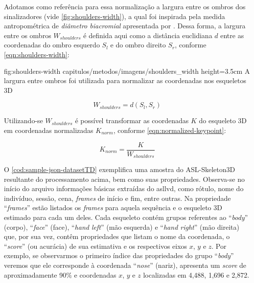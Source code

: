 \begin{enumerate}
          Adotamos como referência para essa normalização a largura entre os ombros dos sinalizadores (vide \autoref{fig:shoulders-width}), a qual foi inspirada pela medida antropométrica de \textit{diâmetro biacromial} apresentada por . Dessa forma, a largura entre os ombros \(W_{shoulders}\) é definida aqui como a distância euclidiana \(d\) entre as coordenadas do ombro esquerdo \(S_{l}\) e do ombro direito \(S_ {r}\), conforme \autoref{eqn:shoulders-width}:

          \figura
          {fig:shoulders-width} %
          {capitulos/metodos/imagens/shoulders_width} %
          {height=3.5cm} %
          {A largura entre ombros foi utilizada para normalizar as coordenadas nos esqueletos 3D} %
          {} %

          \begin{equation}
              \label{eqn:shoulders-width}
              W_{shoulders} = d\left(S_{l}, S_{r}\right)
          \end{equation}

          Utilizando-se \(W_{shoulders}\) é possível transformar as coordenadas \(K\) do esqueleto 3D em coordenadas normalizadas \(K_{norm}\), conforme \autoref{eqn:normalized-keypoint}:

          \begin{equation}
              \label{eqn:normalized-keypoint}
              K_{norm} = \frac{K}{W_{shoulders}}
          \end{equation}

\end{enumerate}


O \autoref{cod:sample-json-datasetTD} exemplifica uma amostra do ASL-Skeleton3D resultante do processamento acima, bem como suas propriedades. Observa-se no início do arquivo informações básicas extraídas do \acrshort{asllvd}, como rótulo, nome do indivíduo, sessão, cena, \textit{frames} de início e fim, entre outras. Na propriedade ``\textit{frames}'' estão listados os \textit{frames} para aquela sequência e o esqueleto 3D estimado para cada um deles. Cada esqueleto contém grupos referentes ao ``\textit{body}'' (corpo), ``\textit{face}'' (face), ``\textit{hand left}'' (mão esquerda) e ``\textit{hand right}'' (mão direita) que, por sua vez, contêm propriedades que listam o nome da coordenada, o ``\textit{score}'' (ou acurácia) de sua estimativa e os respectivos eixos \(x\), \(y\) e \(z\).
Por exemplo, se observarmos o primeiro índice das propriedades do grupo ``\textit{body}'' veremos que ele corresponde à coordenada ``\textit{nose}'' (nariz), apresenta um \textit{score} de aproximadamente 90\% e coordenadas \(x\), \(y\) e \(z\) localizadas em 4,488, 1,696 e 2,872.

